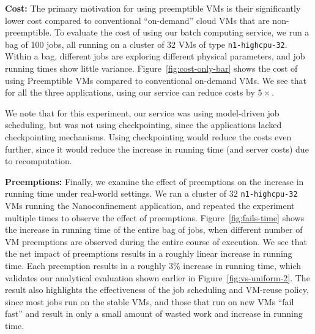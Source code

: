 \noindent \textbf{Cost:}
The primary motivation for using preemptible VMs is their significantly lower cost compared to conventional ``on-demand'' cloud VMs that are non-preemptible.
To evaluate the cost of using our batch computing service, we run a bag of 100 jobs, all running on a cluster of 32 VMs of type \texttt{n1-highcpu-32}. 
Within a bag, different jobs are exploring different physical parameters, and job running times show little variance. 
Figure~\ref{fig:cost-only-bar} shows the cost of using Preemptible VMs compared to conventional on-demand VMs.
We see that for all the three applications, using our service can reduce costs by $5\times$.

We note that for this experiment, our  service was using model-driven job scheduling, but was not using checkpointing, since the applications lacked checkpointing mechanisms.
Using checkpointing would reduce the costs even further, since it would reduce the increase in running time (and server costs) due to recomputation.


\noindent \textbf{Preemptions:} 
Finally, we examine the effect of preemptions on the increase in running time under real-world settings.
We ran a cluster of 32 \texttt{n1-highcpu-32} VMs running the Nanoconfinement application, and repeated the experiment multiple times to observe the effect of preemptions.
Figure~\ref{fig:fails-time} shows the increase in running time of the entire bag of jobs, when different number of VM preemptions are observed during the entire course of execution.
We see that the net impact of preemptions results in a roughly linear increase in running time. 
Each preemption results in a roughly 3\% increase in running time, which validates our analytical evaluation shown earlier in Figure~\ref{fig:vs-uniform-2}.
The result also highlights the effectiveness of the job scheduling and VM-reuse policy, since most jobs run on the stable VMs, and  those that run on new VMs ``fail fast'' and result in only a small amount of wasted work and increase in running time. 






